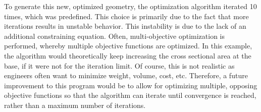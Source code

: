 To generate this new, optimized geometry, the optimization algorithm iterated 10 times, which was predefined. This choice is primarily due to the fact that more iterations results in unstable behavior. This instability is due to the lack of an additional constraining equation. Often, multi-objective optimization is performed, whereby multiple objective functions are optimized. In this example, the algorithm would theoretically keep increasing the cross sectional area at the base, if it were not for the iteration limit. Of course, this is not realistic as engineers often want to minimize weight, volume, cost, etc. Therefore, a future improvement to this program would be to allow for optimizing multiple, opposing objective functions so that the algorithm can iterate until convergence is reached, rather than a maximum number of iterations.



